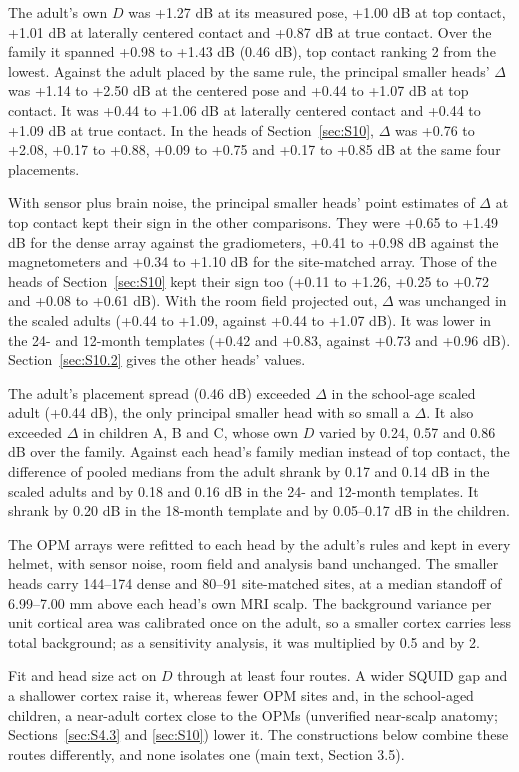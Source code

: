 \documentclass[preprint,12pt,authoryear,a4paper]{elsarticle}
\begin{document}
The adult's own $D$ was +1.27 dB at its measured pose, +1.00 dB at top contact, +1.01 dB at laterally centered contact and +0.87 dB at true contact. Over the family it spanned +0.98 to +1.43 dB (0.46 dB), top contact ranking 2 from the lowest. Against the adult placed by the same rule, the principal smaller heads' $\Delta$ was +1.14 to +2.50 dB at the centered pose and +0.44 to +1.07 dB at top contact. It was +0.44 to +1.06 dB at laterally centered contact and +0.44 to +1.09 dB at true contact. In the heads of Section~\ref{sec:S10}, $\Delta$ was +0.76 to +2.08, +0.17 to +0.88, +0.09 to +0.75 and +0.17 to +0.85 dB at the same four placements.

With sensor plus brain noise, the principal smaller heads' point estimates of $\Delta$ at top contact kept their sign in the other comparisons. They were +0.65 to +1.49 dB for the dense array against the gradiometers, +0.41 to +0.98 dB against the magnetometers and +0.34 to +1.10 dB for the site-matched array. Those of the heads of Section~\ref{sec:S10} kept their sign too (+0.11 to +1.26, +0.25 to +0.72 and +0.08 to +0.61 dB). With the room field projected out, $\Delta$ was unchanged in the scaled adults (+0.44 to +1.09, against +0.44 to +1.07 dB). It was lower in the 24- and 12-month templates (+0.42 and +0.83, against +0.73 and +0.96 dB). Section~\ref{sec:S10.2} gives the other heads' values.

The adult's placement spread (0.46 dB) exceeded $\Delta$ in the school-age scaled adult (+0.44 dB), the only principal smaller head with so small a $\Delta$. It also exceeded $\Delta$ in children A, B and C, whose own $D$ varied by 0.24, 0.57 and 0.86 dB over the family. Against each head's family median instead of top contact, the difference of pooled medians from the adult shrank by 0.17 and 0.14 dB in the scaled adults and by 0.18 and 0.16 dB in the 24- and 12-month templates. It shrank by 0.20 dB in the 18-month template and by 0.05–0.17 dB in the children.

The OPM arrays were refitted to each head by the adult's rules and kept in every helmet, with sensor noise, room field and analysis band unchanged. The smaller heads carry 144–174 dense and 80–91 site-matched sites, at a median standoff of 6.99–7.00 mm above each head's own MRI scalp. The background variance per unit cortical area was calibrated once on the adult, so a smaller cortex carries less total background; as a sensitivity analysis, it was multiplied by 0.5 and by 2.

Fit and head size act on $D$ through at least four routes. A wider SQUID gap and a shallower cortex raise it, whereas fewer OPM sites and, in the school-aged children, a near-adult cortex close to the OPMs (unverified near-scalp anatomy; Sections~\ref{sec:S4.3} and \ref{sec:S10}) lower it. The constructions below combine these routes differently, and none isolates one (main text, Section 3.5).
\end{document}
